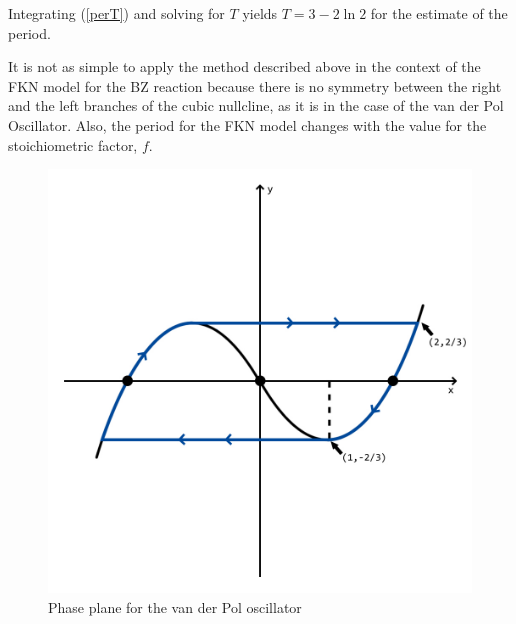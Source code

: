 \documentclass[]{article}
\numberwithin{equation}{section}		%
\begin{document}
Integrating (\ref{perT}) and solving for $T$ yields $T=3-2\ln 2$ for the estimate of the period.

It is not as simple to apply the method described above in the context of the FKN model for the BZ reaction because there is no symmetry between the right and the left branches of the cubic nullcline, as it is in the case of the van der Pol Oscillator. Also, the period for the FKN model changes with the value for the stoichiometric factor, $f$.

\begin{figure}
\caption{Phase plane for the van der Pol oscillator}
\begin{center}
\includegraphics[scale=.25]{figures/van_der_Pol_oscillator.jpg}
\end{center}
\label{fig:vdp}
\end{figure}
\end{document}
